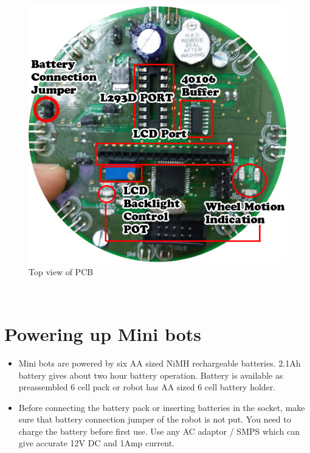 \documentclass[a4paper,12pt,oneside]{book}
\begin{document}
	\begin{figure}[h!]
		\includegraphics[width=\textwidth]{./HardwareManual/Front.jpg}
		\caption{Top view of PCB}
	\end{figure}
	\hfill\\
	
	\chapter{Powering up Mini bots}
	\begin{itemize}
		\item{Mini bots are powered by six AA sized NiMH rechargeable batteries. 2.1Ah battery gives about
			two hour battery operation. Battery is available as preassembled 6 cell pack or robot has AA
			sized 6 cell battery holder.}
		\item{Before connecting the battery pack or inserting batteries in the socket, make sure that 	battery connection jumper of the robot is not put. You need to charge the battery before first use. Use any AC adaptor / SMPS	which can give accurate 12V DC and 1Amp current.}
	\end{itemize}
	
\end{document}
